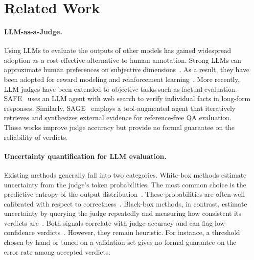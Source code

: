 \section{Related Work}
\label{sec:related}

\paragraph{LLM-as-a-Judge.}
Using LLMs to evaluate the outputs of other models has gained widespread adoption as a cost-effective alternative to human annotation. Strong LLMs can approximate human preferences on subjective dimensions~\citep{liu-etal-2023-g}. As a result, they have been adopted for reward modeling and reinforcement learning~\citep{son2024llmasajudgerewardmodel}. More recently, LLM judges have been extended to objective tasks such as factual evaluation. SAFE~\citep{NEURIPS2024_937ae0e8} uses an LLM agent with web search to verify individual facts in long-form responses. Similarly, SAGE~\citep{tale_sb} employs a tool-augmented agent that iteratively retrieves and synthesizes external evidence for reference-free QA evaluation. These works improve judge accuracy but provide no formal guarantee on the reliability of verdicts.

\paragraph{Uncertainty quantification for LLM evaluation.}
Existing methods generally fall into two categories. White-box methods estimate uncertainty from the judge's token probabilities. The most common choice is the predictive entropy of the output distribution~\citep{malinin2021uncertainty}. These probabilities are often well calibrated with respect to correctness~\citep{kadavath2022languagemodelsmostlyknow}. Black-box methods, in contrast, estimate uncertainty by querying the judge repeatedly and measuring how consistent its verdicts are~\citep{002WSLCNCZ23, wang-etal-2024-conu}. Both signals correlate with judge accuracy and can flag low-confidence verdicts~\citep{scope}. However, they remain heuristic. For instance, a threshold chosen by hand or tuned on a validation set gives no formal guarantee on the error rate among accepted verdicts.

